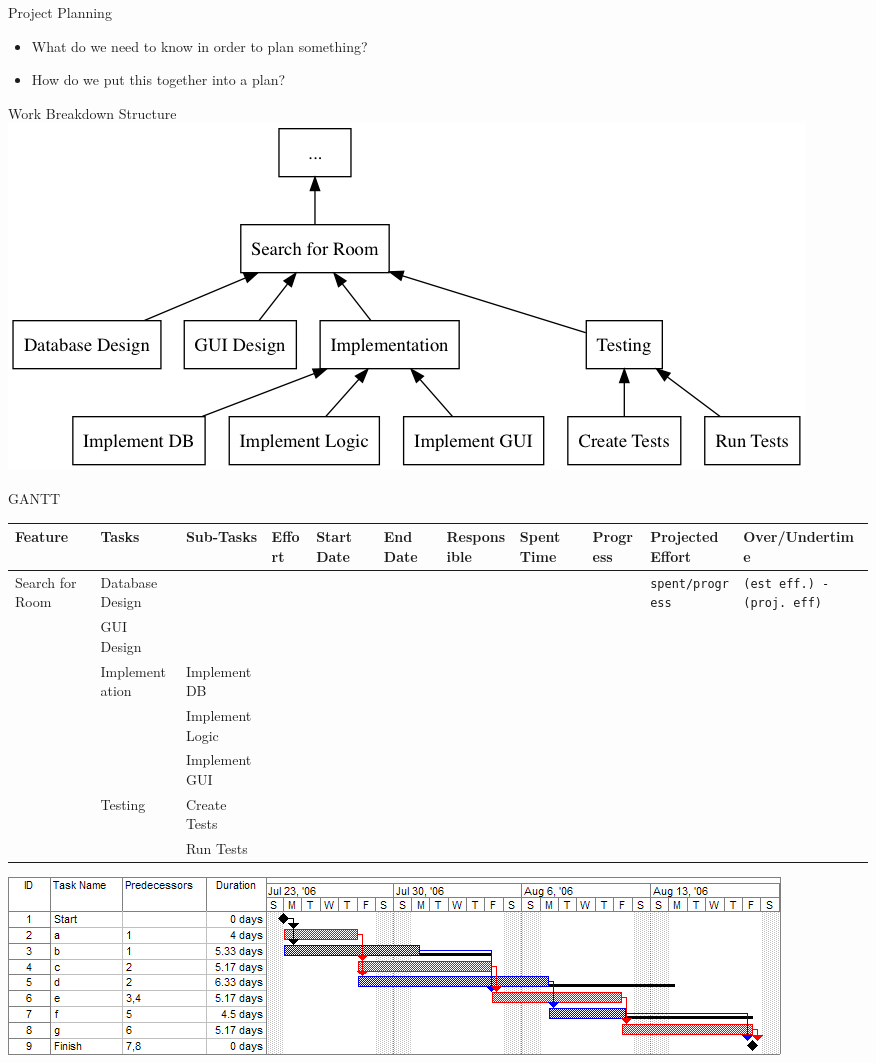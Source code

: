 \documentclass[10pt,t,a4paper]{beamer}
\begin{document}
\begin{frame}[label=sec-1-6]{Project Planning}
\begin{itemize}
\item What do we need to know in order to plan something?
\item How do we put this together into a plan?
\end{itemize}
\end{frame}
\begin{frame}[label=sec-1-7]{Work Breakdown Structure}
\includegraphics[width=.9\linewidth]{FWBSExample.png}
\end{frame}

\begin{frame}[fragile,shrink=60,label=sec-1-8]{GANTT}

 \begin{center}
\begin{tabular}{lllllllllll}
Feature & Tasks & Sub-Tasks & Effort & Start Date & End Date & Responsible & Spent Time & Progress & Projected Effort & Over/Undertime\\
\hline
Search for Room & Database Design &  &  &  &  &  &  &  & \verb~spent/progress~ & \verb~(est eff.) - (proj. eff)~\\
 & GUI Design &  &  &  &  &  &  &  &  & \\
 & Implementation & Implement DB &  &  &  &  &  &  &  & \\
 &  & Implement Logic &  &  &  &  &  &  &  & \\
 &  & Implement GUI &  &  &  &  &  &  &  & \\
 & Testing & Create Tests &  &  &  &  &  &  &  & \\
 &  & Run Tests &  &  &  &  &  &  &  & \\
\end{tabular}
\end{center}


\includegraphics[width=.9\linewidth]{./IGANTT.png}
\end{frame}
\end{document}
